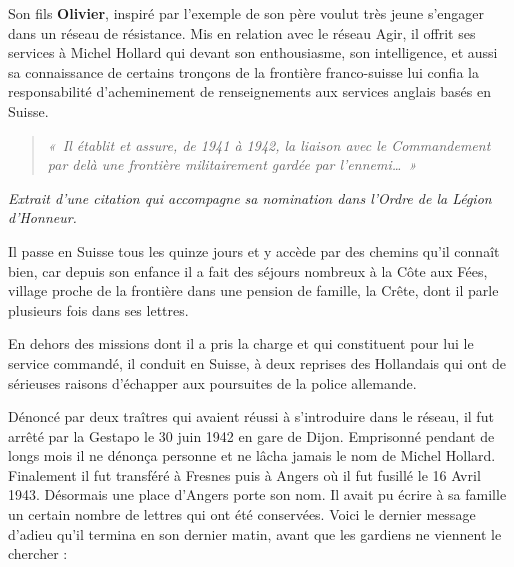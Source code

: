 Son fils \textbf{Olivier}, inspiré par l’exemple de son père voulut très jeune s’engager dans un réseau
de résistance. Mis en relation avec le réseau Agir, il offrit ses services à Michel Hollard qui
devant son enthousiasme, son intelligence, et aussi sa connaissance de certains tronçons de la
frontière franco-suisse lui confia la responsabilité d’acheminement de renseignements aux
services anglais basés en Suisse.

\begin{quote}\itshape
«~Il établit et assure, de 1941 à 1942, la liaison avec le Commandement par delà une frontière militairement
gardée par l’ennemi…~»
\end{quote}

\begin{center}
\noindent\textit{Extrait d’une citation qui accompagne sa nomination dans l’Ordre de la Légion d’Honneur.}\\
\end{center}

Il passe en Suisse tous les quinze jours et y accède par des chemins qu’il connaît bien, car
depuis son enfance il a fait des séjours nombreux à la Côte aux Fées, village proche de la
frontière dans une pension de famille, la Crête, dont il parle plusieurs fois dans ses lettres.

En dehors des missions dont il a pris la charge et qui constituent pour lui le service commandé,
il conduit en Suisse, à deux reprises des Hollandais qui ont de sérieuses raisons d’échapper
aux poursuites de la police allemande.


Dénoncé par deux traîtres qui avaient réussi à s’introduire dans le réseau, il fut arrêté par la
Gestapo le 30 juin 1942 en gare de Dijon. Emprisonné pendant de longs mois il ne dénonça
personne et ne lâcha jamais le nom de Michel Hollard. Finalement il fut transféré à Fresnes
puis à Angers où il fut fusillé le 16 Avril 1943. Désormais une place d’Angers porte son nom.
Il avait pu écrire à sa famille un certain nombre de lettres qui ont été conservées. Voici le
dernier message d’adieu qu’il termina en son dernier matin, avant que les gardiens ne
viennent le chercher :

